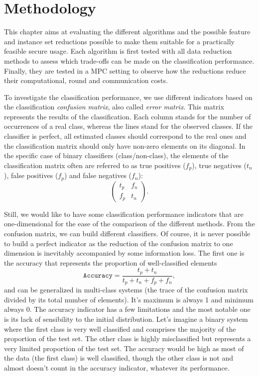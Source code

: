 \section{Methodology}
This chapter aims at evaluating the different algorithms and the possible feature and instance set reductions possible to make them suitable for a practically feasible secure usage. Each algorithm is first tested with all data reduction methods to assess which trade-offs can be made on the classification performance. Finally, they are tested in a MPC setting to observe how the reductions reduce their computational, round and communication costs.

To investigate the classification performance, we use different indicators based on the classification \emph{confusion matrix}, also called \emph{error matrix}. This matrix represents the results of the classification. Each column stands for the number of occurrences of a real class, whereas the lines stand for the observed classes. If the classifier is perfect, all estimated classes should correspond to the real ones and the classification matrix should only have non-zero elements on its diagonal. In the specific case of binary classifiers (class/non-class), the elements of the classification matrix often are referred to as true positives ($f_p$), true negatives ($t_n$), false positives ($f_p$) and false negatives ($f_n$):
\begin{equation}
    \begin{pmatrix}
    t_p & f_n \\
    f_p & t_n
    \end{pmatrix}.
\end{equation}

Still, we would like to have some classification performance indicators that are one-dimensional for the ease of the comparison of the different methods. From the confusion matrix, we can build different classifiers. Of course, it is never possible to build a perfect indicator as the reduction of the confusion matrix to one dimension is inevitably accompanied by some information loss. The first one is the accuracy that represents the proportion of well-classified elements
\begin{equation}
    \mathtt{Accuracy} = \frac{t_p + t_n}{t_p + t_n + f_p + f_n},
\end{equation}
and can be generalized in multi-class systems (the trace of the confusion matrix divided by its total number of elements). It's maximum is always 1 and minimum always 0. The accuracy indicator has a few limitations and the most notable one is its lack of sensibility to the initial distribution. Let's imagine a binary system where the first class is very well classified and comprises the majority of the proportion of the test set. The other class is highly misclassified but represents a very limited proportion of the test set. The accuracy would be high as most of the data (the first class) is well classified, though the other class is not and almost doesn't count in the accuracy indicator, whatever its performance.

